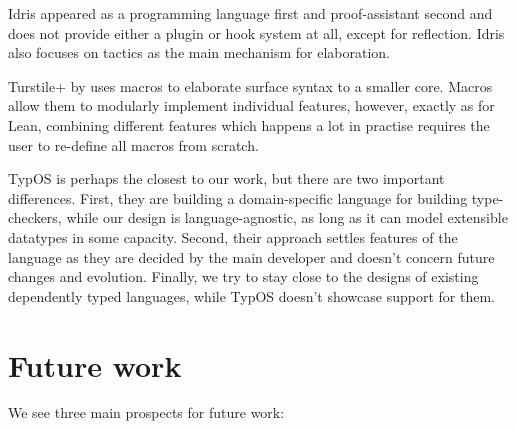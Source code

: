 \documentclass[
  sigconf,
  screen,
  review]{acmart}
\begin{document}
Idris
\citep{bradyIdrisGeneralpurposeDependently2013, christiansenElaboratorReflectionExtending2016}
appeared as a programming language first and proof-assistant second and
does not provide either a plugin or hook system at all, except for
reflection. Idris also focuses on tactics as the main mechanism for
elaboration.

Turstile+ by \citet{changDependentTypeSystems2019} uses macros to
elaborate surface syntax to a smaller core. Macros allow them to
modularly implement individual features, however, exactly as for Lean,
combining different features which happens a lot in practise requires
the user to re-define all macros from scratch.

TypOS \citep{allaisTypOSOperatingSystem2022a, guillaumeallaisTypOS2022}
is perhaps the closest to our work, but there are two important
differences. First, they are building a domain-specific language for
building type-checkers, while our design is language-agnostic, as long
as it can model extensible datatypes in some capacity. Second, their
approach settles features of the language as they are decided by the
main developer and doesn't concern future changes and evolution.
Finally, we try to stay close to the designs of existing dependently
typed languages, while TypOS doesn't showcase support for them.

\hypertarget{future-work}{%
\section{Future work}\label{future-work}}

We see three main prospects for future work:
\end{document}

